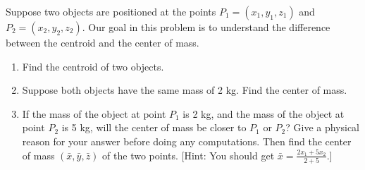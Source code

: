 \begin{problem}\label{center of mass with two points}%
 Suppose two objects are positioned at the points $P_1=(x_1,y_1,z_1)$ and $P_2=(x_2,y_2,z_2)$.
 Our goal in this problem is to understand the difference between the centroid and the center of mass.
\begin{enumerate}
\item Find the centroid of two objects.
 \item {}%
Suppose both objects have the same mass of 2 kg.  Find the center of mass.%
 \item If the mass of the object at point $P_1$ is 2 kg, and the mass of the object at point $P_2$ is 5 kg, will the center of mass be closer to $P_1$ or $P_2$? Give a physical reason for your answer before doing any computations.  Then find the center of mass $(\bar x, \bar y, \bar z)$ of the two points. [Hint: You should get $\bar x= \frac{2x_1+5x_2}{2+5}$.] 
\end{enumerate}
\end{problem}


